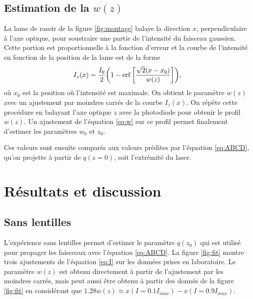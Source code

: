 \documentclass[10pt,letterpaper,twocolumn]{article}
\newcommand{\s}{\hspace{0.1cm}}
\DeclarePairedDelimiter\autobracket{(}{)}
\newcommand{\br}[1]{\autobracket*{#1}}
\begin{document}
\subsection{Estimation de la $w(z)$}\label{sec:wz}
La lame de rasoir de la figure \ref{fig:montage} balaye la direction $x$, perpendiculaire à l'axe optique, pour soustraire une partie de l'intensité du faisceau gaussien. Cette portion est proportionnelle à la fonction d'erreur\supercite{Yoshida1976} et la courbe de l'intensité en fonction de la position de la lame est de la forme
\begin{equation}\label{eq:I}
	I_z(x) = \frac{I_0}{2}\br{1 - \erf\left[\frac{\sqrt{2}(x-x_0)}{w(z)}  \right]  },
\end{equation}
où $x_0$ est la position où l'intensité est maximale. On obtient le paramètre $w(z)$ avec un ajustement par moindres carrés de la courbe $I_z(x)$. On répète cette procédure en balayant l'axe optique $z$ avec la photodiode pour obtenir le profil $w(z)$. Un ajustement de l'équation \eqref{eq:w} sur ce profil permet finalement d'estimer les paramètres $w_0$ et $z_0$.\par
Ces valeurs sont ensuite comparés aux valeurs prédites par l'équation \eqref{eq:ABCD}, qu'on projette à partir de $q(z=0)$, soit l'extrémité du laser.




\section{Résultats et discussion}\label{sec:resultats} %
\subsection{Sans lentilles}
L'expérience sans lentilles permet d'estimer le paramètre $q(z_0)$ qui est utilisé pour propager les faisceaux avec l'équation \eqref{eq:ABCD}. La figure \ref{fig:fit} montre trois ajustements de l'équation \eqref{eq:I} sur les données prises en laboratoire. Le paramètre $w(z)$ est obtenu directement à partir de l'ajustement par les moindres carrés, mais peut aussi être obtenu à partir des donnés de la figure \ref{fig:fit} en considérant que $1.28w(z) \approx x(I = 0.1I_{max}) - x(I = 0.9I_{max})$.
\end{document}

